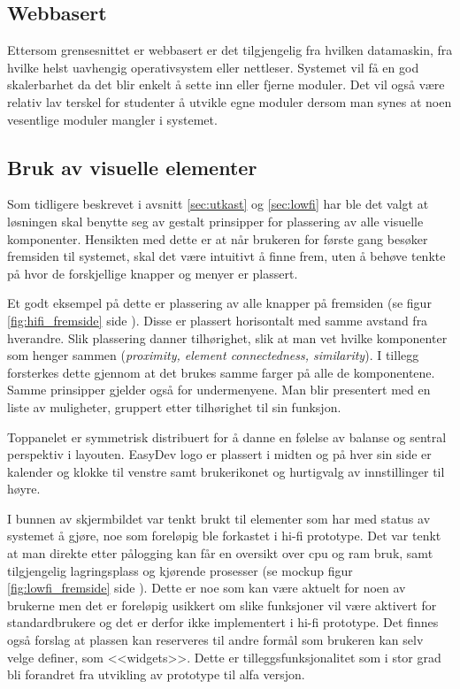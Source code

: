\subsection{Webbasert}
Ettersom grensesnittet er webbasert er det tilgjengelig fra hvilken datamaskin, fra hvilke helst uavhengig operativsystem eller nettleser. Systemet vil få en god skalerbarhet da det blir enkelt å sette inn eller fjerne moduler. Det vil også være relativ lav terskel for studenter å utvikle egne moduler dersom man synes at noen vesentlige moduler mangler i systemet. 

\subsection{Bruk av visuelle elementer}
Som tidligere beskrevet i avsnitt \ref{sec:utkast} og \ref{sec:lowfi} har ble det valgt at løsningen skal benytte seg av gestalt prinsipper for plassering av alle visuelle komponenter. 
Hensikten med dette er at når brukeren for første gang besøker fremsiden til systemet, skal det være intuitivt å finne frem, uten å behøve tenkte på hvor de forskjellige knapper og menyer er plassert. 

Et godt eksempel på dette er plassering av alle knapper på fremsiden (se figur \ref{fig:hifi_fremside} side \pageref{fig:hifi_fremside}). 
Disse er plassert horisontalt med samme avstand fra hverandre. 
Slik plassering danner tilhørighet, slik at man vet hvilke komponenter som henger sammen (\textit{proximity, element connectedness, similarity}). I tillegg forsterkes dette gjennom at det brukes samme farger på alle de komponentene.\cite{forelesning:tulpesh}
Samme prinsipper gjelder også for undermenyene. Man blir presentert med en liste av muligheter, gruppert etter tilhørighet til sin funksjon. 

Toppanelet er symmetrisk distribuert for å danne en følelse av balanse og sentral perspektiv i layouten. EasyDev logo er plassert i midten og på hver sin side er kalender og klokke til venstre samt brukerikonet og hurtigvalg av innstillinger til høyre.

I bunnen av skjermbildet var tenkt brukt til elementer som har med status av systemet å gjøre, noe som foreløpig ble forkastet i hi-fi prototype. 
Det var tenkt at man direkte etter pålogging kan får en oversikt over cpu og ram bruk, samt tilgjengelig lagringsplass og kjørende prosesser (se mockup figur \ref{fig:lowfi_fremside} side \pageref{fig:lowfi_fremside}). 
Dette er noe som kan være aktuelt for noen av brukerne men det er foreløpig usikkert om slike funksjoner vil være aktivert for standardbrukere og det er derfor ikke implementert i hi-fi prototype. Det finnes også forslag at plassen kan reserveres til andre formål som brukeren kan selv velge definer, som <<widgets>>. Dette er tilleggsfunksjonalitet som i stor grad bli forandret fra utvikling av prototype til alfa versjon.

